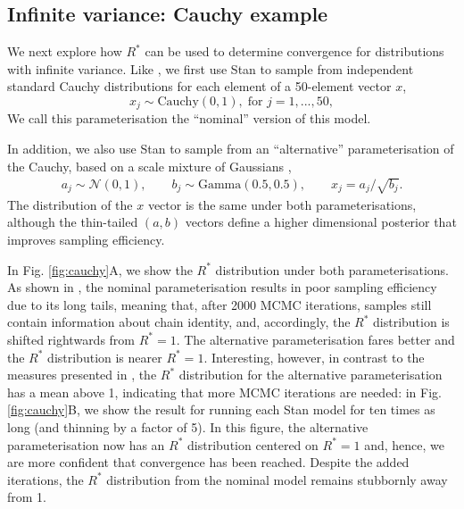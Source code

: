 \documentclass{article}
\newcommand{\N}{\mathcal{N}}
\begin{document}
\subsection{Infinite variance: Cauchy example}
We next explore how $R^*$ can be used to determine convergence for distributions with infinite variance. Like \cite{vehtari2019rank}, we first use Stan to sample from independent standard Cauchy distributions for each element of a 50-element vector $x$,
%
\begin{equation}
x_j\sim \text{Cauchy}(0, 1),\; \text{for } j=1,...,50,
\end{equation}
%
We call this parameterisation the ``nominal'' version of this model.

In addition, we also use Stan to sample from an ``alternative'' parameterisation of the Cauchy, based on a scale mixture of Gaussians \cite{vehtari2019rank},
%
\begin{align}
a_j \sim  \N(0,1), \qquad
b_j \sim  \text{Gamma}(0.5, 0.5), \qquad
x_j =  a_j/\sqrt{b_j}.
\end{align}
%
The distribution of the $x$ vector is the same under both parameterisations, although the thin-tailed $(a,b)$ vectors define a higher dimensional posterior that improves sampling efficiency.

In Fig. \ref{fig:cauchy}A, we show the $R^*$ distribution under both parameterisations. As shown in \cite{vehtari2019rank}, the nominal parameterisation results in poor sampling efficiency due to its long tails, meaning that, after 2000 MCMC iterations, samples still contain information about chain identity, and, accordingly, the $R^*$ distribution is shifted rightwards from $R^*=1$. The alternative parameterisation fares better and the $R^*$ distribution is nearer $R^*=1$. Interesting, however, in contrast to the measures presented in \cite{vehtari2019rank}, the $R^*$ distribution for the alternative parameterisation has a mean above 1, indicating that more MCMC iterations are needed: in Fig. \ref{fig:cauchy}B, we show the result for running each Stan model for ten times as long (and thinning by a factor of 5). In this figure, the alternative parameterisation now has an $R^*$ distribution centered on $R^*=1$ and, hence, we are more confident that convergence has been reached. Despite the added iterations, the $R^*$ distribution from the nominal model remains stubbornly away from 1.
\end{document}

